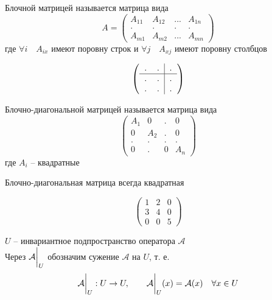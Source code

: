 \begin{definition}
	Блочной матрицей называется матрица вида
	$$ A =
	\begin{pmatrix}
		A_{11} & A_{12} & ... & A_{1n} \\
		. & . & . & . \\
		A_{m1} & A_{m2} & ... & A_{mn}
	\end{pmatrix} $$
	где $ \forall i \quad A_{ix} $ имеют поровну строк и $ \forall j \quad A_{xj} $ имеют поровну столбцов
\end{definition}

\begin{eg}
	$$ \left(
	\begin{tabular}{c c | c}
		. & . & . \\
		\hline
		. & . & . \\
		. & . & .
	\end{tabular} \right) $$
\end{eg}

\begin{definition}
	Блочно-диагональной матрицей называется матрица вида
	$$
	\begin{pmatrix}
		A_1 & 0 & . & 0 \\
		0 & A_2 & . & 0 \\
		. & . & . & . \\
		0 & . & 0 & A_n
	\end{pmatrix} $$
	где $ A_i $ -- квадратные
\end{definition}

\begin{remark}
	Блочно-диагональная матрица всегда квадратная
\end{remark}

\begin{eg}
	$$
	\begin{pmatrix}
		1 & 2 & 0 \\
		3 & 4 & 0 \\
		0 & 0 & 5
	\end{pmatrix} $$
\end{eg}

\begin{definition}
	$ U $ -- инвариантное подпространство оператора $ \mathcal{A} $ \\
	Через $ \mathcal{A}\bigg|_{U}^{} $ обозначим сужение $ \mathcal{A} $ на $ U $, т. е.
	$$ \mathcal{A}\bigg|_{U}^{} : U \to U, \qquad \mathcal{A}\bigg|_{U}^{}(x) = \mathcal{A}(x) \quad \forall x \in U $$
\end{definition}

